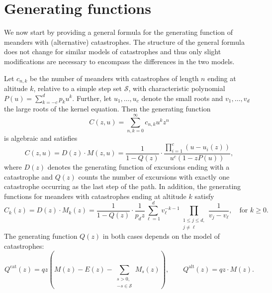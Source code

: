 \section{Generating functions}
\label{section:gf_catastrophes}

We now start by providing a general formula for the generating function of meanders with (alternative) catastrophes. The structure of the general formula does not change for similar models of catastrophes and thus only slight modifications are necessary to encompass the differences in the two models.

\begin{theorem} \label{thm:gf_catastrophes}
  Let $c_{n,k}$ be the number of meanders with catastrophes of length $n$ ending at altitude $k$, relative to a simple step set $\mathcal{S}$, with characteristic polynomial $P(u) = \sum_{k=-c}^d p_ku^k$.
  Further, let $u_1,\dots,u_c$ denote the small roots and $v_1,\dots,v_d$ the large roots of the kernel equation.
  Then the generating function 
  $$
  C(z,u) = \sum_{n,k = 0}^\infty c_{n,k} u^k z^n
  $$ 
  is algebraic and satisfies 
  \begin{equation*}
    C(z,u) = D(z) \cdot M(z,u) = \frac{1}{1 - Q(z)} \cdot \frac{\prod_{i=1}^c(u - u_i(z))}{u^c(1 - zP(u))},
  \end{equation*}
  where $D(z)$ denotes the generating function of excursions ending with a catastrophe and $Q(z)$ counts the number of excursions with exactly one catastrophe occurring as the last step of the path.
  In addition, the generating functions for meanders with catastrophes ending at altitude $k$ satisfy
  \begin{equation*}
    C_k(z) = D(z) \cdot M_k(z) = \frac{1}{1 - Q(z)} \cdot \frac{1}{p_d z} \sum_{\ell = 1}^d v_\ell^{-k-1} \prod_{\substack{1 \leq j \leq d, \\ j \neq \ell}} \frac{1}{v_j - v_\ell}, \quad \text{for $k \geq 0$}.
  \end{equation*}
  The generating function $Q(z)$ in both cases depends on the model of catastrophes:
  \begin{equation*}
    Q^\mathrm{cat}(z) = q z \left(M(z) - E(z) - \sum_{\substack{s > 0, \\ -s\in \mathcal{S}}} M_s(z)\right), \qquad
    Q^\mathrm{alt}(z) = q z \cdot M(z). 
  \end{equation*}
\end{theorem}

